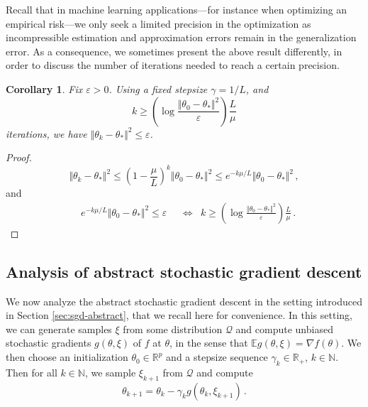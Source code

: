 \documentclass[11pt,reqno]{article}
\newcommand{\N}{\mathbb{N}}
\newcommand{\E}{\mathbb{E}}
\newcommand{\R}{\mathbb{R}}
\newcommand{\cQ}{\mathcal{Q}}
\renewcommand{\leq}{\leqslant}
\renewcommand{\geq}{\geqslant}
\numberwithin{equation}{section}
\theoremstyle{plain}
\newtheorem{coro}[assumption]{Corollary}
\theoremstyle{definition}
\theoremstyle{remark}
\begin{document}
Recall that in machine learning applications---for instance when optimizing an empirical risk---we only seek a limited precision in the optimization as incompressible estimation and approximation errors remain in the generalization error. As a consequence, we sometimes present the above result differently, in order to discuss the number of iterations needed to reach a certain precision.

\begin{coro}
	\label{coro:gd}
	Fix $\varepsilon > 0$. Using a fixed stepsize $\gamma = 1/L$, and 
	\begin{equation*}
		k \geq \left(\log \frac{\Vert \theta_0 - \theta_* \Vert^2}{\varepsilon}\right) \frac{L}{\mu}
	\end{equation*}
	iterations, we have $\Vert \theta_k - \theta_* \Vert^2 \leq \varepsilon$.
\end{coro}

\begin{proof}
	\begin{equation*}
		\Vert \theta_k - \theta_* \Vert^2 \leq \left(1 - \frac{\mu}{L}\right)^k \Vert \theta_0 - \theta_* \Vert^2 \leq e^{-k \mu/L} \Vert \theta_0 - \theta_* \Vert^2 \, ,
	\end{equation*}
	and
	\begin{align*}
		&e^{-k \mu/L} \Vert \theta_0 - \theta_* \Vert^2 \leq \varepsilon &&\Longleftrightarrow &k \geq \left(\log \frac{\Vert \theta_0 - \theta_* \Vert^2}{\varepsilon}\right) \frac{L}{\mu} \, .
	\end{align*}
\end{proof}



\subsection{Analysis of abstract stochastic gradient descent}
\label{sec:analysis-sgd}

We now analyze the abstract stochastic gradient descent in the setting introduced in Section \ref{sec:sgd-abstract}, that we recall here for convenience. In this setting, we can generate samples $\xi$ from some distribution $\cQ$ and compute unbiased stochastic gradients $g(\theta, \xi)$ of $f$ at $\theta$, in the sense that $\E g(\theta, \xi) = \nabla f(\theta)$. We then choose an initialization $\theta_0 \in \R^p$ and a stepsize sequence $\gamma_k \in \R_+$, $k \in \N$. Then for all $k \in \N$, we sample $\xi_{k+1}$ from $\cQ$ and compute 
\begin{equation*}
	\theta_{k+1} = \theta_k - \gamma_k g(\theta_k, \xi_{k+1}) \, .
\end{equation*}
\end{document}
